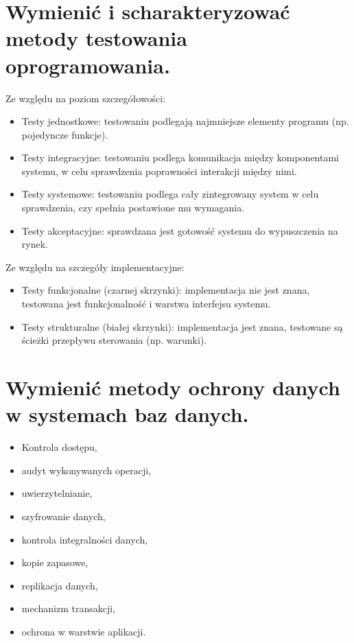 \documentclass[12pt,a4paper]{article}
\begin{document}
	\section{Wymienić i scharakteryzować metody testowania oprogramowania.}
	Ze względu na poziom szczegółowości:
		\begin{itemize}
			\item Testy jednostkowe: testowaniu podlegają najmniejsze elementy programu (np. pojedyncze funkcje).
			\item Testy integracyjne: testowaniu podlega komunikacja między komponentami systemu, w celu sprawdzenia poprawności interakcji między nimi.
			\item Testy systemowe: testowaniu podlega cały zintegrowany system w celu sprawdzenia, czy spełnia postawione mu wymagania.
			\item Testy akceptacyjne: sprawdzana jest gotowość systemu do wypuszczenia na rynek.
		\end{itemize}
	Ze względu na szczegóły implementacyjne:
		\begin{itemize}
			\item Testy funkcjonalne (czarnej skrzynki): implementacja nie jest znana, testowana jest funkcjonalność i warstwa interfejsu systemu.
			\item Testy strukturalne (białej skrzynki): implementacja jest znana, testowane są ścieżki przepływu sterowania (np. warunki).
		\end{itemize}


	\section{Wymienić metody ochrony danych w systemach baz danych.}
	\begin{multicols}{2}
		\begin{itemize}
			\item Kontrola dostępu,
			\item audyt wykonywanych operacji,
			\item uwierzytelnianie,
			\item szyfrowanie danych,
			\item kontrola integralności danych,
			\item kopie zapasowe,
			\item replikacja danych,
			\item mechanizm transakcji,
			\item ochrona w warstwie aplikacji.
		\end{itemize}
	\end{multicols}
\end{document}
